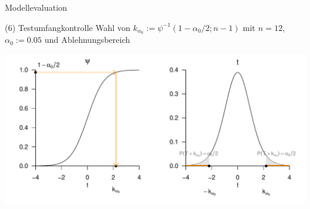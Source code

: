 \documentclass[
  8pt,
  ignorenonframetext,
]{beamer}
\begin{document}
\begin{frame}{Modellevaluation}
\protect\hypertarget{modellevaluation-13}{}

\noindent (6) Testumfangkontrolle \small \vfill \center Wahl von
\(k_{\alpha_0} := \psi^{-1}(1 - \alpha_0/2; n-1)\) mit \(n =12\),
\(\alpha_0 := 0.05\) und Ablehnungsbereich \vspace{3mm}

\begin{center}\includegraphics[width=0.8\linewidth]{9_Abbildungen/alm_9_t_test_ungerichtet_testumfangkontrolle} \end{center}
\end{frame}
\end{document}
